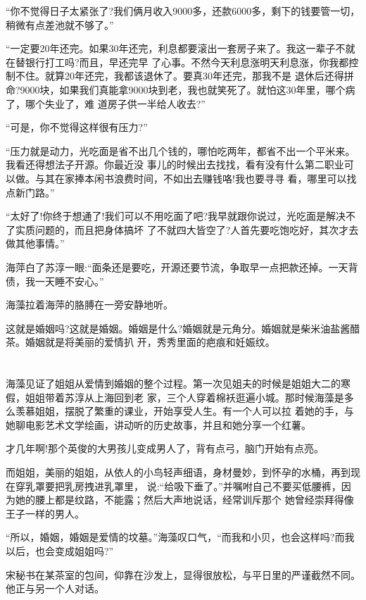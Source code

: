 \documentclass[11pt,a4paper,onecolumn]{article}
\begin{document}
``你不觉得日子太紧张了?我们俩月收入9000多，还款6000多，剩下的钱要管一切，稍微有点差池就不够了。''

``一定要20年还完。如果30年还完，利息都要滚出一套房子来了。我这一辈子不就在替银行打工吗?而且，早还完早
了心事。不然今天利息涨明天利息涨，你我都控制不住。就算20年还完，我都该退休了。要真30年还完，那我不是
退休后还得拼命?9000块，如果我们真能拿9000块到老，我也就笑死了。就怕这30年里，哪个病了，哪个失业了，难
道房子供一半给人收去?''

``可是，你不觉得这样很有压力?''

``压力就是动力，光吃面是省不出几个钱的，哪怕吃两年，都省不出一个平米来。我看还得想法子开源。你最近没
事儿的时候出去找找，看有没有什么第二职业可以做。与其在家捧本闲书浪费时间，不如出去赚钱咯!我也要寻寻
看，哪里可以找点新门路。''

``太好了!你终于想通了!我们可以不用吃面了吧?我早就跟你说过，光吃面是解决不了实质问题的，而且把身体搞坏
了不就四大皆空了?人首先要吃饱吃好，其次才去做其他事情。''

海萍白了苏淳一眼:``面条还是要吃，开源还要节流，争取早一点把款还掉。一天背债，我一天睡不安心。''

海藻拉着海萍的胳膊在一旁安静地听。

这就是婚姻吗?这就是婚姻。婚姻是什么?婚姻就是元角分。婚姻就是柴米油盐酱醋茶。婚姻就是将美丽的爱情扒
开，秀秀里面的疤痕和妊娠纹。

\section[\thesection]{}

海藻见证了姐姐从爱情到婚姻的整个过程。第一次见姐夫的时候是姐姐大二的寒假，姐姐带着苏淳从上海回到老
家，三个人穿着棉袄逛遍小城。那时候海藻是多么羡慕姐姐，摆脱了繁重的课业，开始享受人生。有一个人可以拉
着她的手，与她聊电影艺术文学绘画，讲动听的历史故事，并且和她分享一个红薯。

才几年啊!那个英俊的大男孩儿变成男人了，背有点弓，脑门开始有点亮。

而姐姐，美丽的姐姐，从依人的小鸟轻声细语，身材曼妙，到怀孕的水桶，再到现在穿乳罩要把乳房拽进乳罩里，
说:``给吸下垂了。''并嘱咐自己不要买低腰裤，因为她的腰上都是纹路，不能露；然后大声地说话，经常训斥那个
她曾经崇拜得像王子一样的男人。

``所以，婚姻，婚姻是爱情的坟墓。''海藻叹口气，``而我和小贝，也会这样吗?而我以后，也会变成姐姐吗?''

宋秘书在某茶室的包间，仰靠在沙发上，显得很放松，与平日里的严谨截然不同。他正与另一个人对话。
\end{document}
